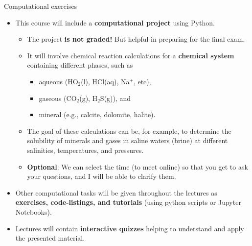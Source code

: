 \begin{frame}{Computational exercises}
\small

\begin{itemize}
\item This course will include a \alert{\textbf{computational project}} using Python.
%
\begin{itemize}
\item The project \textbf{is not graded!} But helpful in preparing for the final exam.
\pause
\item It will involve chemical reaction calculations for a \textbf{chemical system} containing different 
phases, such as 
%
\begin{itemize}
\item aqueous (HO$_2$(l), HCl(aq), Na$^+$, etc), 
\item gaseous (CO$_{2}$(g), H$_{2}$S(g)), and 
\item mineral (e.g., calcite, dolomite, halite). 
\end{itemize}
\pause
\item The goal of these calculations can be, for example, to determine the solubility
of minerals and gases in saline waters (brine) at different salinities,
temperatures, and pressures. 
\pause
\item \textbf{Optional}: We can select the time (to meet online) so that you get to ask your questions, 
and I will be able to clarify them. 
\end{itemize}
\pause
\item Other computational tasks will be given throughout the lectures as \alert{\textbf{exercises, code-listings, and tutorials}} (using python scripts or Jupyter Notebooks).
%
\pause
\item Lectures will contain \alert{\textbf{interactive quizzes}} helping to understand and apply the presented material. 
%
\end{itemize}
\end{frame}

